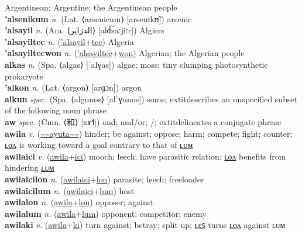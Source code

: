 Argentinean; Argentine; the Argentinean people \label{'alhentinawon} \\
\textbf{'alsenikum} \textit{n.} (Lat. ⟨arsenicum⟩ [arsenɪkʊ̃])
arsenic \label{'alsenikum} \\
\textbf{'alsayil} \textit{n.} (Ara. ⟨الدزاير⟩ [ald͡zaːjiːr])
Algiers \label{'alsayil} \\
\textbf{'alsayiltec} \textit{n.} (\hyperref['alsayil]{'alsayil}+\hyperref[tec]{tec})
Algeria \label{'alsayiltec} \\
\textbf{'alsayiltecwon} \textit{n.} (\hyperref['alsayiltec]{'alsayiltec}+\hyperref[won]{won})
Algerian; the Algerian people \label{'alsayiltecwon} \\
\textbf{alkas} \textit{n.} (Spa. ⟨algas⟩ [ˈalɣas])
algae; moss; tiny clumping photosynthetic prokaryote \label{alkas} \\
\textbf{'alkon} \textit{n.} (Lat. ⟨argon⟩ [arɡɔn])
argon \label{'alkon} \\
\textbf{alkun} \textit{spec.} (Spa. ⟨algunos⟩ [alˈɣunos])
some; 	extit{describes an unspecified subset of the following noun phrase} \label{alkun} \\
\textbf{aw} \textit{spec.} (Cmn. ⟨和⟩ [xɤ˧˥])
and; and/or; /; 	extit{delineates a conjugate phrase} \label{aw} \\
\textbf{awila} \textit{v.} (\hyperref[ayuta]{\~{}\~{}ayuta\~{}\~{}})
hinder; be against; oppose; harm; compete; fight; counter; \hyperref[awilalon]{ʟᴏᴧ} is working toward a goal contrary to that of \hyperref[awilalum]{ʟᴜᴍ} \label{awila} \\
\textbf{awilaici} \textit{v.} (\hyperref[awila]{awila}+\hyperref[ici]{ici})
mooch; leech; have parasitic relation; \hyperref[awilaicilon]{ʟᴏᴧ} benefits from hindering \hyperref[awilaicilum]{ʟᴜᴍ} \label{awilaici} \\
\textbf{awilaicilon} \textit{n.} (\hyperref[awilaici]{awilaici}+\hyperref[lon]{lon})
parasite; leech; freeloader \label{awilaicilon} \\
\textbf{awilaicilum} \textit{n.} (\hyperref[awilaici]{awilaici}+\hyperref[lum]{lum})
host \label{awilaicilum} \\
\textbf{awilalon} \textit{n.} (\hyperref[awila]{awila}+\hyperref[lon]{lon})
opposer; against \label{awilalon} \\
\textbf{awilalum} \textit{n.} (\hyperref[awila]{awila}+\hyperref[lum]{lum})
opponent; competitor; enemy \label{awilalum} \\
\textbf{awilaki} \textit{v.} (\hyperref[awila]{awila}+\hyperref[ki]{ki})
turn against; betray; split up; \hyperref[awilakiles]{ʟєꜱ} turns \hyperref[awilakilon]{ʟᴏᴧ} against ʟᴜᴍ \label{awilaki} \\
